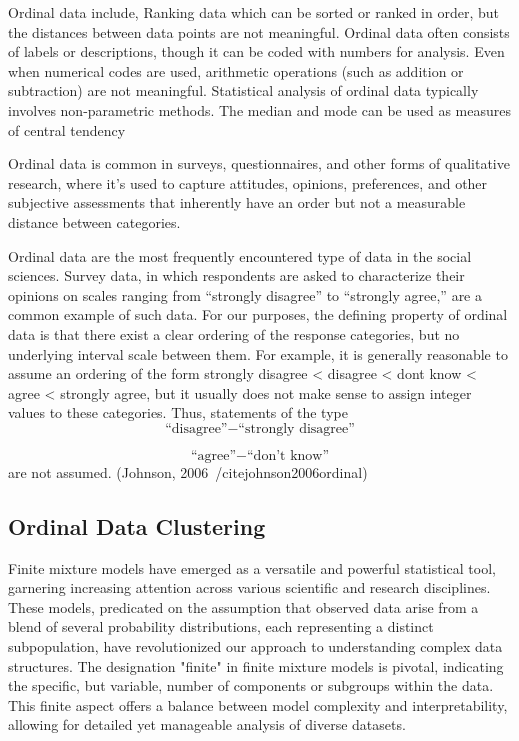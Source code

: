\documentclass{article}
\begin{document}
Ordinal data include, Ranking data which can be sorted or ranked in order, but the distances between data points are not meaningful.
Ordinal data often consists of labels or descriptions, though it can be coded with numbers for analysis. Even when numerical codes are used, arithmetic operations (such as addition or subtraction) are not meaningful.
Statistical analysis of ordinal data typically involves non-parametric methods. The median and mode can be used as measures of central tendency

Ordinal data is common in surveys, questionnaires, and other forms of qualitative research, where it's used to capture attitudes, opinions, preferences, and other subjective assessments that inherently have an order but not a measurable distance between categories. 

Ordinal data are the most frequently encountered type of data in the social
sciences. Survey data, in which respondents are asked to characterize their opinions
on scales ranging from “strongly disagree” to “strongly agree,” are a common
example of such data. For our purposes, the defining property of ordinal data
is that there exist a clear ordering of the response categories, but no underlying
interval scale between them. For example, it is generally reasonable to assume an
ordering of the form
strongly disagree < disagree < dont know < agree < strongly agree,
but it usually does not make sense to assign integer values to these categories.
Thus, statements of the type
\[
\text{``disagree''} - \text{``strongly disagree''}
\]

\[
\text{``agree''} - \text{``don't know''}
\]
are not assumed. (Johnson, 2006~/cite{johnson2006ordinal})


\subsection*{Ordinal Data Clustering}

Finite mixture models have emerged as a versatile and powerful statistical tool, garnering increasing attention across various scientific and research disciplines. These models, predicated on the assumption that observed data arise from a blend of several probability distributions, each representing a distinct subpopulation, have revolutionized our approach to understanding complex data structures. The designation "finite" in finite mixture models is pivotal, indicating the specific, but variable, number of components or subgroups within the data. This finite aspect offers a balance between model complexity and interpretability, allowing for detailed yet manageable analysis of diverse datasets.
\end{document}
